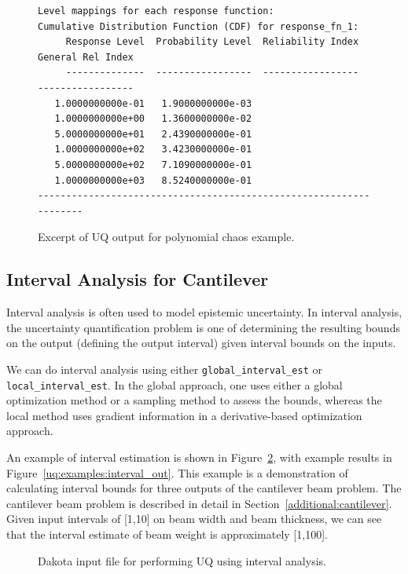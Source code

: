 \begin{figure}
\begin{bigbox}
\begin{scriptsize}
\begin{verbatim}
Level mappings for each response function:
Cumulative Distribution Function (CDF) for response_fn_1:
     Response Level  Probability Level  Reliability Index  General Rel Index
     --------------  -----------------  -----------------  -----------------
   1.0000000000e-01   1.9000000000e-03
   1.0000000000e+00   1.3600000000e-02
   5.0000000000e+01   2.4390000000e-01
   1.0000000000e+02   3.4230000000e-01
   5.0000000000e+02   7.1090000000e-01
   1.0000000000e+03   8.5240000000e-01
-------------------------------------------------------------------
\end{verbatim}
\end{scriptsize}
\end{bigbox}
\caption{Excerpt of UQ output for polynomial chaos example.}
\label{uq:examples:pce_out}
\end{figure}


\subsection{Interval Analysis for Cantilever}\label{uq:examples:interval}

Interval analysis is often used to model epistemic uncertainty. 
In interval analysis, the 
uncertainty quantification problem is one of determining the 
resulting bounds on the output (defining the output interval) 
given interval bounds on the inputs. 

We can do interval analysis using either
\texttt{global\_interval\_est} or \texttt{local\_interval\_est}.
In the global approach, one uses either a global optimization 
method or a sampling method to assess the bounds, whereas the 
local method uses gradient information in a derivative-based 
optimization approach. 
 
An example of interval estimation 
is shown in Figure~\ref{uq:examples:interval_input}, with example results in 
Figure~\ref{uq:examples:interval_out}. This example is a demonstration 
of calculating interval bounds for three outputs of the cantilever beam 
problem. The cantilever beam problem is described in detail in 
Section~\ref{additional:cantilever}. Given input intervals of [1,10] on 
beam width and beam thickness, we can see that the interval estimate of 
beam weight is approximately [1,100].

\begin{figure}
  \centering
  \begin{bigbox}
    \begin{small}
    \end{small}
  \end{bigbox}
\caption{Dakota input file for performing UQ using interval analysis.}
\label{uq:examples:interval_input}
\end{figure}


